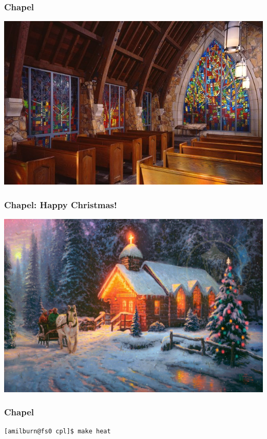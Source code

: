 \documentclass{beamer}
\begin{document}
\begin{frame}
 \frametitle{Chapel}
 \includegraphics[width=\textwidth]{chapel.jpg}
\end{frame}
 
\begin{frame}
 \frametitle{Chapel: Happy Christmas!}
 \includegraphics[width=\textwidth]{chrcha.jpg}
\end{frame}

\begin{frame}[fragile]
 \frametitle{Chapel}
\begin{verbatim}
[amilburn@fs0 cpl]$ make heat
\end{verbatim}
\end{frame}
\end{document}
